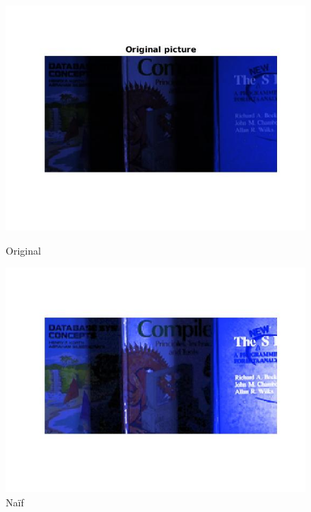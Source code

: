 \documentclass{article}
\begin{document}
\begin{figure}[h]
\centering
\begin{minipage}{0.33\textwidth}
\centering
\includegraphics[width=1\textwidth]{images/book_conc_depart.jpg}
\caption{Original}
\end{minipage}%
\begin{minipage}{0.33\textwidth}
\centering
\includegraphics[width=1\textwidth]{images/book_conc_inter.jpg}
\caption{Naïf}
\end{minipage}%
\begin{minipage}{0.33\textwidth}
\centering

\end{minipage}
\end{figure}
\end{document}
